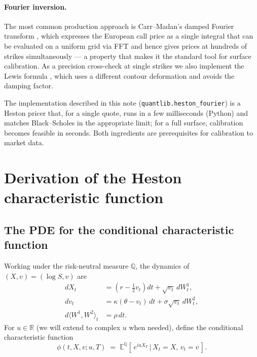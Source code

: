 \documentclass[11pt]{article}
\theoremstyle{plain}
\theoremstyle{definition}
\theoremstyle{remark}
\begin{document}
\paragraph{Fourier inversion.} The most common production approach is Carr--Madan's damped Fourier transform \cite{CarrMadan1999}, which expresses the European call price as a single integral that can be evaluated on a uniform grid via FFT and hence gives prices at hundreds of strikes simultaneously --- a property that makes it the standard tool for surface calibration. As a precision cross-check at single strikes we also implement the Lewis formula \cite{Lewis2000}, which uses a different contour deformation and avoids the damping factor.

The implementation described in this note (\texttt{quantlib.heston\_fourier}) is a Heston pricer that, for a single quote, runs in a few milliseconds (Python) and matches Black--Scholes in the appropriate limit; for a full surface, calibration becomes feasible in seconds. Both ingredients are prerequisites for calibration to market data.

\section{Derivation of the Heston characteristic function}

\subsection{The PDE for the conditional characteristic function}

Working under the risk-neutral measure \(\mathbb{Q}\), the dynamics of \((X, v) = (\log S, v)\) are
\begin{align}
    dX_t &= \left(r - \tfrac{1}{2} v_t\right) dt + \sqrt{v_t}\, dW^1_t,                         \label{eq:X-dyn}\\
    dv_t &= \kappa(\theta - v_t)\, dt + \sigma\sqrt{v_t}\, dW^2_t,                              \label{eq:v-dyn}\\
    d\langle W^1, W^2\rangle_t &= \rho\, dt.                                                    \label{eq:rho-dyn}
\end{align}
For \(u \in \mathbb{R}\) (we will extend to complex \(u\) when needed), define the conditional characteristic function
\[
    \phi(t, X, v; u, T) \;=\; \mathbb{E}^{\mathbb{Q}}\!\left[\,e^{i u X_T}\,\big|\,X_t = X,\,v_t = v\,\right].
\]
\end{document}
